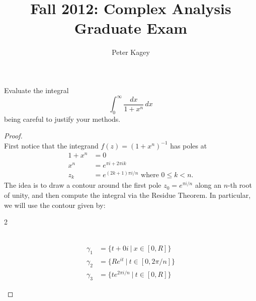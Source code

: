 \documentclass{article}
\newenvironment{problem}[2][Problem]{\begin{trivlist}
\item[\hskip \labelsep {\bfseries #1}\hskip \labelsep {\bfseries #2.}]}{\end{trivlist}}
\begin{document}
\title{Fall 2012: Complex Analysis Graduate Exam}
\author{Peter Kagey}

\maketitle

\begin{problem}{1}
  Evaluate the integral \[
    \int_0^\infty \frac{dx}{1 + x^n}\,dx
  \] being careful to justify your methods.
\end{problem}

\begin{proof} $ $\\
  First notice that the integrand $f(z) = (1 + x^n)^{-1}$ has poles at \begin{align*}
    1 + x^n &= 0 \\
    x^n     &= e^{\pi i + 2\pi i k} \\
    z_k     &= e^{(2k + 1)\pi i/n} \text{ where } 0 \leq k < n.
  \end{align*}
  The idea is to draw a contour around the first pole $z_0 = e^{\pi i/n}$ along an $n$-th root
  of unity, and then compute the integral via the Residue Theorem.
  In particular, we will use the contour given by:
  \begin{multicols}{2}
  \\
  \begin{align}
    \gamma_{1} &= \{t + 0i\ |\ x \in [0, R] \} \\
    \gamma_{2} &= \{R e^{it}\ |\ t \in [0,2\pi/n] \} \\
    \gamma_{3} &= \{t e^{2\pi i/n}\ |\ t \in [0, R]\}
  \end{align}

\end{multicols}
\end{proof}
\end{document}
